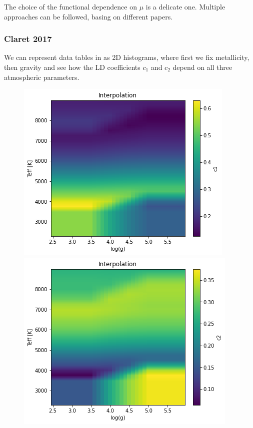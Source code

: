 \documentclass[a4paper,11pt,twocolumn]{article}
\begin{document}
The choice of the functional dependence on $\mu$ is a delicate one. Multiple 
approaches can be followed, basing on different papers. 

\subsubsection{Claret 2017}
We can represent data tables in \cite{claret2017} as 2D histograms, 
where first we fix metallicity, then gravity and see how the LD coefficients 
$c_1$ and $c_2$ depend on all three atmospheric parameters.
\begin{figure}[H]
    \centering  
    \includegraphics[scale=0.25, angle=0]{../pictures/Claret2017/2017_c1_fixedmet}
    \includegraphics[scale=0.25, angle=0]{../pictures/Claret2017/2017_c2_fixedmet}


\end{figure}
\end{document}
